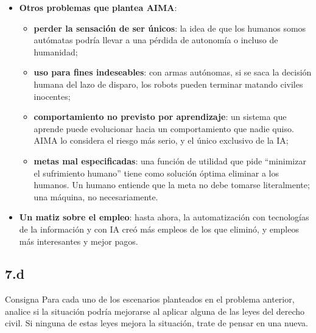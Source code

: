 \documentclass[11pt,a4paper]{article}
\begin{document}
\begin{extras}
\begin{itemize}
  \item \textbf{Otros problemas que plantea AIMA}:
  \begin{itemize}
    \item \textbf{perder la sensación de ser únicos}: la idea de que los humanos somos autómatas podría llevar a una pérdida de autonomía o incluso de humanidad;
    \item \textbf{uso para fines indeseables}: con armas autónomas, si se saca la decisión humana del lazo de disparo, los robots pueden terminar matando civiles inocentes;
    \item \textbf{comportamiento no previsto por aprendizaje}: un sistema que aprende puede evolucionar hacia un comportamiento que nadie quiso. AIMA lo considera el riesgo más serio, y el único exclusivo de la IA;
    \item \textbf{metas mal especificadas}: una función de utilidad que pide ``minimizar el sufrimiento humano'' tiene como solución óptima eliminar a los humanos. Un humano entiende que la meta no debe tomarse literalmente; una máquina, no necesariamente.
  \end{itemize}
  \item \textbf{Un matiz sobre el empleo}: hasta ahora, la automatización con tecnologías de la información y con IA creó más empleos de los que eliminó, y empleos más interesantes y mejor pagos.
\end{itemize}
\end{extras}

\subsection{7.d}

\begin{enunciado}{Consigna}
Para cada uno de los escenarios planteados en el problema anterior, analice si la situación podría mejorarse al aplicar alguna de las leyes del derecho civil. Si ninguna de estas leyes mejora la situación, trate de pensar en una nueva.
\end{enunciado}
\end{document}
